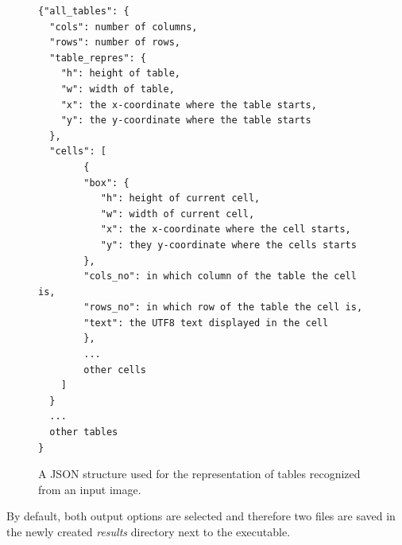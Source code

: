 \begin{figure}[t]
\begin{lstlisting}
{"all_tables": {
  "cols": number of columns,
  "rows": number of rows,
  "table_repres": {
    "h": height of table,
    "w": width of table,
    "x": the x-coordinate where the table starts,
    "y": the y-coordinate where the table starts
  },
  "cells": [
        {
        "box": {
           "h": height of current cell,
           "w": width of current cell,
           "x": the x-coordinate where the cell starts,
           "y": they y-coordinate where the cells starts
        },
        "cols_no": in which column of the table the cell is,
        "rows_no": in which row of the table the cell is,
        "text": the UTF8 text displayed in the cell
        },
        ...
        other cells
    ]
  }
  ...
  other tables
}
\end{lstlisting}
\caption{A JSON structure used for the representation of tables recognized from an input image.}
\label{fig:jsonout}
\end{figure}

By default, both output options are selected and therefore two files are saved in the newly created \emph{results} directory next to the executable.

